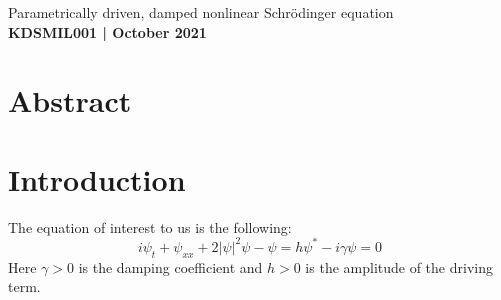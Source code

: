 \documentclass[11pt]{article}
\numberwithin{equation}{section}
\numberwithin{figure}{section}
\numberwithin{table}{section}
\begin{document}
\begin{center}
    {\huge Parametrically driven, damped nonlinear Schr\"odinger equation}\\
    \vspace{0.2in}
    \textbf{KDSMIL001 | October 2021}

    \section*{Abstract}\label{sec:Abstract}
    
    
\end{center}

\section{Introduction}\label{sec:Introduction}
\par The equation of interest to us is the following:
\begin{equation}
    i\psi_t+\psi_{xx}+2|\psi|^2\psi-\psi=h\psi^*-i\gamma\psi=0
    \label{eqn:original}
\end{equation}
Here $\gamma>0$ is the damping coefficient and $h>0$ is the amplitude of the driving term. 
\end{document}

